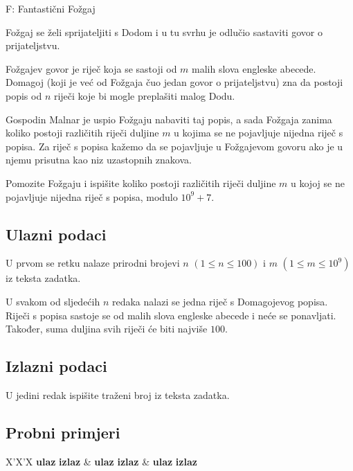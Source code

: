 \begin{statement}[
  timelimit=1.5 s,
  memorylimit=512 MiB,
]{F: Fantastični Fožgaj}

Fožgaj se želi sprijateljiti s Dodom i u tu svrhu je odlučio sastaviti govor o
prijateljstvu.

Fožgajev govor je riječ koja se sastoji od $m$ malih slova engleske abecede.
Domagoj (koji je već od Fožgaja čuo jedan govor o prijateljstvu) zna da postoji
popis od $n$ riječi koje bi mogle preplašiti malog Dodu.

Gospodin Malnar je uspio Fožgaju nabaviti taj popis, a sada Fožgaja zanima
koliko postoji različitih riječi duljine $m$ u kojima se ne pojavljuje nijedna
riječ s popisa. Za riječ s popisa kažemo da se pojavljuje u Fožgajevom govoru
ako je u njemu prisutna kao niz uzastopnih znakova.

Pomozite Fožgaju i ispišite koliko postoji različitih riječi duljine $m$ u kojoj
se ne pojavljuje nijedna riječ s popisa, modulo $10^9 + 7$.


\subsection*{Ulazni podaci}
U prvom se retku nalaze prirodni brojevi $n$ $(1 \le n \le 100)$ i
$m$ $(1 \le m \le 10^9)$ iz teksta zadatka.

U svakom od sljedećih $n$ redaka nalazi se jedna riječ s Domagojevog popisa.
Riječi s popisa sastoje se od malih slova engleske abecede i neće se ponavljati.
Također, suma duljina svih riječi će biti najviše $100$.

\subsection*{Izlazni podaci}
U jedini redak ispišite traženi broj iz teksta zadatka.

\subsection*{Probni primjeri}
\begin{tabularx}{\textwidth}{X'X'X}
  \textbf{ulaz}
  \linespread{1}{}
  \textbf{izlaz}
  \linespread{1}{} &
  \textbf{ulaz}
  \linespread{1}{}
  \textbf{izlaz}
  \linespread{1}{} &
  \textbf{ulaz}
  \linespread{1}{}
  \textbf{izlaz}
  \linespread{1}{}
\end{tabularx}

\end{statement}

